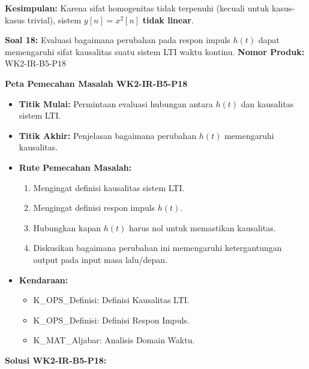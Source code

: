 \documentclass[
  letterpaper,
  DIV=11,
  numbers=noendperiod]{scrreprt}
\providecommand{\tightlist}{%
  \setlength{\itemsep}{0pt}\setlength{\parskip}{0pt}}
\begin{document}
\textbf{Kesimpulan:} Karena sifat homogenitas tidak terpenuhi (kecuali
untuk kasus-kasus trivial), sistem \(y[n] = x^2[n]\) \textbf{tidak
linear}.

\textbf{Soal 18:} Evaluasi bagaimana perubahan pada respon impuls
\(h(t)\) dapat memengaruhi sifat kausalitas suatu sistem LTI waktu
kontinu. \textbf{Nomor Produk:} WK2-IR-B5-P18

\textbf{Peta Pemecahan Masalah WK2-IR-B5-P18}

\begin{itemize}
\tightlist
\item
  \textbf{Titik Mulai:} Permintaan evaluasi hubungan antara \(h(t)\) dan
  kausalitas sistem LTI.
\item
  \textbf{Titik Akhir:} Penjelasan bagaimana perubahan \(h(t)\)
  memengaruhi kausalitas.
\item
  \textbf{Rute Pemecahan Masalah:}

  \begin{enumerate}
  \def\labelenumi{\arabic{enumi}.}
  \tightlist
  \item
    Mengingat definisi kausalitas sistem LTI.
  \item
    Mengingat definisi respon impuls \(h(t)\).
  \item
    Hubungkan kapan \(h(t)\) harus nol untuk memastikan kausalitas.
  \item
    Diskusikan bagaimana perubahan ini memengaruhi ketergantungan output
    pada input masa lalu/depan.
  \end{enumerate}
\item
  \textbf{Kendaraan:}

  \begin{itemize}
  \tightlist
  \item
    K\_OPS\_Definisi: Definisi Kausalitas LTI.
  \item
    K\_OPS\_Definisi: Definisi Respon Impuls.
  \item
    K\_MAT\_Aljabar: Analisis Domain Waktu.
  \end{itemize}
\end{itemize}

\textbf{Solusi WK2-IR-B5-P18:}
\end{document}
